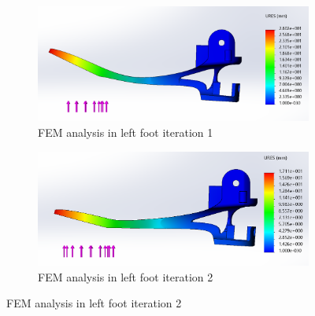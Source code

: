 \begin{figure}[ht]
    \centering
    \begin{subfigure}[b]{0.49\textwidth}
        \includegraphics[width=\textwidth]{figures/fem_5N_1.PNG}
        \caption{FEM analysis in left foot iteration 1}
        \label{fig:fem_foot_iteration_1}
    \end{subfigure}
    \begin{subfigure}[b]{0.49\textwidth}
        \includegraphics[width=\textwidth]{figures/fem_5N_2.PNG}
        \caption{FEM analysis in left foot iteration 2}
        \label{fig:fem_foot_iteration_2}
    \end{subfigure}
\end{figure}

